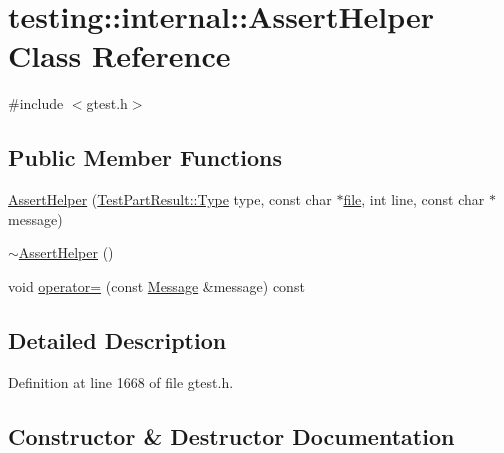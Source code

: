 \hypertarget{classtesting_1_1internal_1_1_assert_helper}{}\section{testing\+:\+:internal\+:\+:Assert\+Helper Class Reference}
\label{classtesting_1_1internal_1_1_assert_helper}


{\ttfamily \#include $<$gtest.\+h$>$}

\subsection*{Public Member Functions}
\begin{DoxyCompactItemize}
\item 
\hyperlink{classtesting_1_1internal_1_1_assert_helper_ac2c9334518fd4087189b4505567a3c90}{Assert\+Helper} (\hyperlink{classtesting_1_1_test_part_result_a65ae656b33fdfdfffaf34858778a52d5}{Test\+Part\+Result\+::\+Type} type, const char $\ast$\hyperlink{_07copy_08_2_read_camera_model_8m_a151631b2fd2bb776ef06c9f440a7ed74}{file}, int line, const char $\ast$message)
\item 
\hyperlink{classtesting_1_1internal_1_1_assert_helper_a51c640785d4ed4a0155cc9aa857d8931}{$\sim$\+Assert\+Helper} ()
\item 
void \hyperlink{classtesting_1_1internal_1_1_assert_helper_ab721be11cb9aca8a361ca1f014ca5f80}{operator=} (const \hyperlink{classtesting_1_1_message}{Message} \&message) const 
\end{DoxyCompactItemize}


\subsection{Detailed Description}


Definition at line 1668 of file gtest.\+h.



\subsection{Constructor \& Destructor Documentation}
